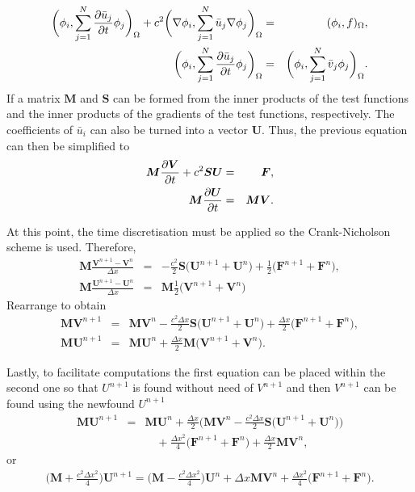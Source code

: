 \begin{eqnarray*}
  \bigg(\phi_i,\sum^N_{j=1}\frac{\partial\bar{u}_j}{\partial t}\phi_j\bigg)_\Omega + c^2\bigg(\nabla\phi_i,\sum^N_{j=1}\bar{u}_j\nabla\phi_j\bigg)_\Omega & = & (\phi_i,f)_\Omega, \\
  \bigg(\phi_i,\sum^N_{j=1}\frac{\partial\bar{u}_j}{\partial t}\phi_j\bigg)_\Omega & = & \bigg(\phi_i,\sum^N_{j=1}\bar{v}_j\phi_j\bigg)_\Omega.
\end{eqnarray*}
If a matrix $\bm{M}$ and $\bm{S}$ can be formed from the inner products of the test functions and the inner products of the gradients of the test functions, respectively. The coefficients of $\bar{u}_i$ can also be turned into a vector $\bm{U}$. Thus, the previous equation can then be simplified to
\begin{eqnarray*}
  \bm{M}\frac{\partial\bm{V}}{\partial t} + c^2\bm{S}\bm{U} & = & \bm{F}, \\
  \bm{M}\frac{\partial\bm{U}}{\partial t} & = & \bm{M}\bm{V}.
\end{eqnarray*}

At this point, the time discretisation must be applied so the Crank-Nicholson scheme is used. Therefore,
\begin{eqnarray*}
  \bm{M}\frac{\bm{V}^{n+1} - \bm{V}^n}{\Delta x} & = & - \frac{c^2}{2}\bm{S}\big(\bm{U}^{n+1} + \bm{U}^n\big) + \frac{1}{2}\big(\bm{F}^{n+1} + \bm{F}^n\big), \\
  \bm{M}\frac{\bm{U}^{n+1} - \bm{U}^n}{\Delta x} & = & \bm{M}\frac{1}{2}\big(\bm{V}^{n+1} + \bm{V}^n\big)
\end{eqnarray*}
Rearrange to obtain
\begin{eqnarray}
  \bm{M}\bm{V}^{n+1} & = & \bm{M}\bm{V}^n - \frac{c^2\Delta x}{2}\bm{S}\big(\bm{U}^{n+1} + \bm{U}^n\big) + \frac{\Delta x}{2}\big(\bm{F}^{n+1} + \bm{F}^n\big), \\
  \bm{M}\bm{U}^{n+1} & = & \bm{M}\bm{U}^n + \frac{\Delta x}{2}\bm{M}\big(\bm{V}^{n+1} + \bm{V}^n\big). \nonumber
\end{eqnarray}

Lastly, to facilitate computations the first equation can be placed within the second one so that $U^{n+1}$ is found without need of $V^{n+1}$ and then $V^{n+1}$ can be found using the newfound $U^{n+1}$
\begin{eqnarray*}
  \bm{M}\bm{U}^{n+1} & = & \bm{M}\bm{U}^n + \frac{\Delta x}{2}\bigg(\bm{M}\bm{V}^n - \frac{c^2\Delta x}{2}\bm{S}\big(\bm{U}^{n+1} + \bm{U}^n\big)\bigg) \\
  &  & \quad + \frac{\Delta x^2}{4}\big(\bm{F}^{n+1} + \bm{F}^n\big) + \frac{\Delta x}{2}\bm{M}\bm{V}^n,
\end{eqnarray*}
or
\begin{eqnarray}
  \bigg(\bm{M} + \frac{c^2\Delta x^2}{4}\bigg)\bm{U}^{n+1} = \bigg(\bm{M} - \frac{c^2\Delta x^2}{4}\bigg)\bm{U}^n + \Delta x\bm{M}\bm{V}^n + \frac{\Delta x^2}{4}\big(\bm{F}^{n+1} + \bm{F}^n\big).
\end{eqnarray}

